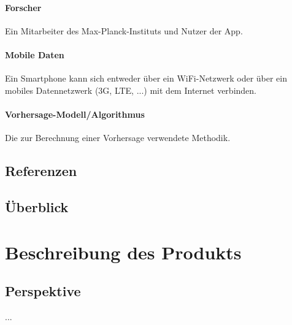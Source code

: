 \documentclass[12pt]{article} %
\begin{document}
 \paragraph{Forscher} Ein Mitarbeiter des Max-Planck-Instituts und Nutzer der App.
 \paragraph{Mobile Daten} Ein Smartphone kann sich entweder über ein WiFi-Netzwerk oder über ein mobiles Datennetzwerk (3G, LTE, ...) mit dem Internet verbinden. 
\paragraph{Vorhersage-Modell/Algorithmus} Die zur Berechnung einer Vorhersage verwendete Methodik. 

\subsection{Referenzen}




\subsection{Überblick}



\section{Beschreibung des Produkts}

\subsection{Perspektive}
...
\end{document}

